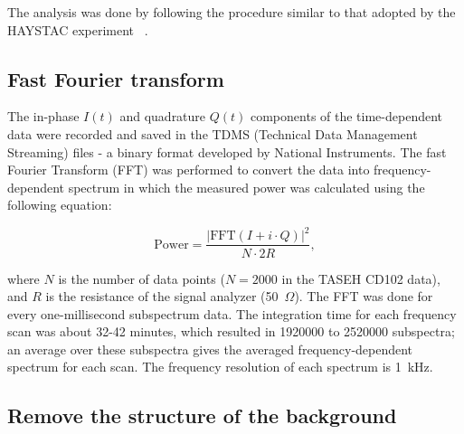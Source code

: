     The analysis was done by following the procedure similar to that 
adopted by the HAYSTAC experiment ~\cite{HAYSTACII}.

\subsection{Fast Fourier transform}
The in-phase $I(t)$ and quadrature $Q(t)$ components of the time-dependent 
data were recorded and saved in the TDMS 
(Technical Data Management Streaming) files - a 
binary format developed by National Instruments.
The fast Fourier Transform (FFT) was performed to convert the data into 
frequency-dependent spectrum in which the measured power was calculated 
using the following equation:

\begin{equation}
\label{eq:4.1}
    \text{Power} = \frac{|\text{FFT}(I+i \cdot Q)|^{2}}{N \cdot 2R},
\end{equation}

where $N$ is the number of data points ($N  = 2000$ in the TASEH 
CD102 data), and $R$ is the resistance of the signal analyzer (50~$\Omega$).
The FFT was done for every one-millisecond subspectrum data. The integration 
time for each frequency scan was about 32-42 minutes, which resulted 
in 1920000 to 2520000 subspectra; an average over these subspectra gives 
the averaged frequency-dependent spectrum for each scan. 
The frequency resolution of each spectrum is 1~kHz. 

\subsection{Remove the structure of the background}

